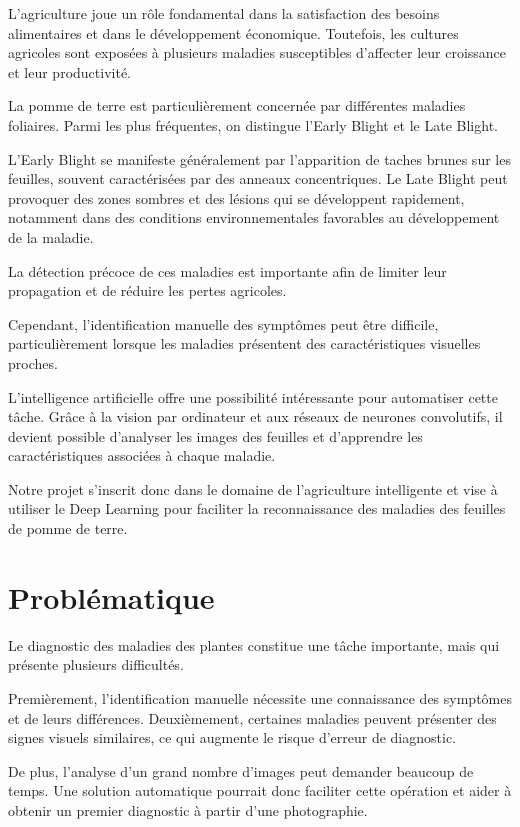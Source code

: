 \documentclass[12pt,a4paper,oneside]{report}
\begin{document}
L'agriculture joue un rôle fondamental dans la satisfaction
des besoins alimentaires et dans le développement économique.
Toutefois, les cultures agricoles sont exposées à plusieurs
maladies susceptibles d'affecter leur croissance et leur
productivité.

La pomme de terre est particulièrement concernée par
différentes maladies foliaires. Parmi les plus fréquentes,
on distingue l'Early Blight et le Late Blight.

L'Early Blight se manifeste généralement par l'apparition
de taches brunes sur les feuilles, souvent caractérisées
par des anneaux concentriques. Le Late Blight peut provoquer
des zones sombres et des lésions qui se développent rapidement,
notamment dans des conditions environnementales favorables
au développement de la maladie.

La détection précoce de ces maladies est importante afin
de limiter leur propagation et de réduire les pertes agricoles.

Cependant, l'identification manuelle des symptômes peut
être difficile, particulièrement lorsque les maladies
présentent des caractéristiques visuelles proches.

L'intelligence artificielle offre une possibilité intéressante
pour automatiser cette tâche. Grâce à la vision par ordinateur
et aux réseaux de neurones convolutifs, il devient possible
d'analyser les images des feuilles et d'apprendre les
caractéristiques associées à chaque maladie.

Notre projet s'inscrit donc dans le domaine de l'agriculture
intelligente et vise à utiliser le Deep Learning pour
faciliter la reconnaissance des maladies des feuilles
de pomme de terre.

\section{Problématique}

Le diagnostic des maladies des plantes constitue une tâche
importante, mais qui présente plusieurs difficultés.

Premièrement, l'identification manuelle nécessite une
connaissance des symptômes et de leurs différences.
Deuxièmement, certaines maladies peuvent présenter des
signes visuels similaires, ce qui augmente le risque
d'erreur de diagnostic.

De plus, l'analyse d'un grand nombre d'images peut demander
beaucoup de temps. Une solution automatique pourrait donc
faciliter cette opération et aider à obtenir un premier
diagnostic à partir d'une photographie.
\end{document}
